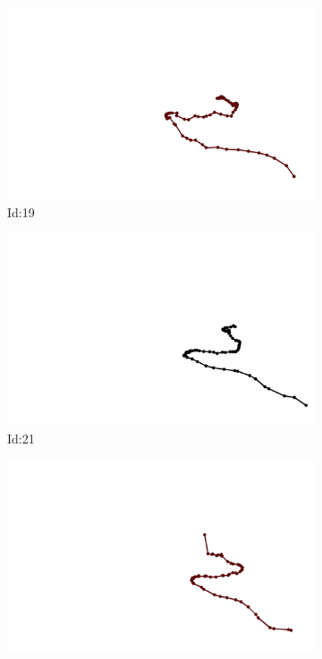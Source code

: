 \documentclass[12pt,twoside]{report}
\begin{document}
\begin{figure}
\centering
\begin{subfigure}[b]{0.20\textwidth}
\centering
\includegraphics[width=\textwidth]{../trajectories/19.png}
\caption{Id:19}
\end{subfigure}
\begin{subfigure}[b]{0.20\textwidth}
\centering
\includegraphics[width=\textwidth]{../trajectories/21.png}
\caption{Id:21}
\end{subfigure}
\begin{subfigure}[b]{0.20\textwidth}
\centering
\includegraphics[width=\textwidth]{../trajectories/68.png}

\end{subfigure}
\end{figure}
\end{document}
